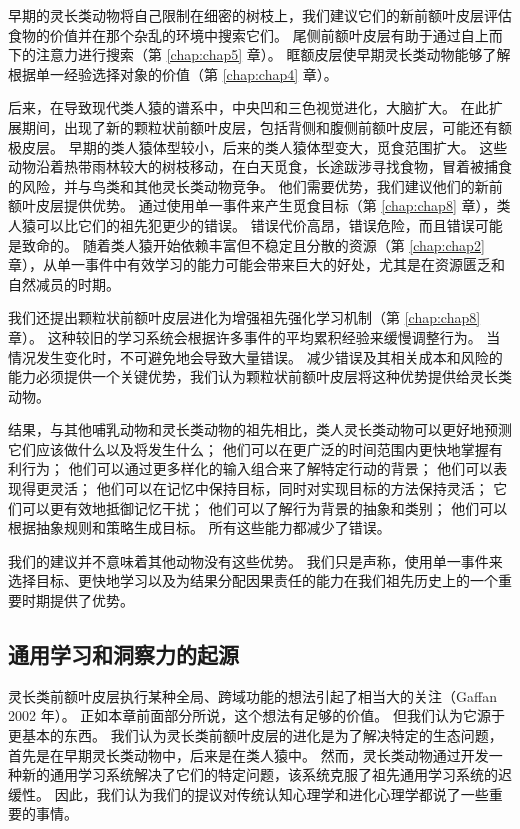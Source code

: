 早期的灵长类动物将自己限制在细密的树枝上，我们建议它们的新前额叶皮层评估食物的价值并在那个杂乱的环境中搜索它们。
尾侧前额叶皮层有助于通过自上而下的注意力进行搜索（第 \ref{chap:chap5} 章）。
眶额皮层使早期灵长类动物能够了解根据单一经验选择对象的价值（第 \ref{chap:chap4} 章）。
\par


后来，在导致现代类人猿的谱系中，中央凹和三色视觉进化，大脑扩大。
在此扩展期间，出现了新的颗粒状前额叶皮层，包括背侧和腹侧前额叶皮层，可能还有额极皮层。
早期的类人猿体型较小，后来的类人猿体型变大，觅食范围扩大。
这些动物沿着热带雨林较大的树枝移动，在白天觅食，长途跋涉寻找食物，冒着被捕食的风险，并与鸟类和其他灵长类动物竞争。
他们需要优势，我们建议他们的新前额叶皮层提供优势。
通过使用单一事件来产生觅食目标（第 \ref{chap:chap8} 章），类人猿可以比它们的祖先犯更少的错误。
错误代价高昂，错误危险，而且错误可能是致命的。
随着类人猿开始依赖丰富但不稳定且分散的资源（第 \ref{chap:chap2} 章），从单一事件中有效学习的能力可能会带来巨大的好处，尤其是在资源匮乏和自然减员的时期。
\par


我们还提出颗粒状前额叶皮层进化为增强祖先强化学习机制（第 \ref{chap:chap8} 章）。
这种较旧的学习系统会根据许多事件的平均累积经验来缓慢调整行为。
当情况发生变化时，不可避免地会导致大量错误。
减少错误及其相关成本和风险的能力必须提供一个关键优势，我们认为颗粒状前额叶皮层将这种优势提供给灵长类动物。
\par


结果，与其他哺乳动物和灵长类动物的祖先相比，类人灵长类动物可以更好地预测它们应该做什么以及将发生什么；
他们可以在更广泛的时间范围内更快地掌握有利行为；
他们可以通过更多样化的输入组合来了解特定行动的背景；
他们可以表现得更灵活；
他们可以在记忆中保持目标，同时对实现目标的方法保持灵活；
它们可以更有效地抵御记忆干扰； 他们可以了解行为背景的抽象和类别；
他们可以根据抽象规则和策略生成目标。
所有这些能力都减少了错误。
\par


我们的建议并不意味着其他动物没有这些优势。
我们只是声称，使用单一事件来选择目标、更快地学习以及为结果分配因果责任的能力在我们祖先历史上的一个重要时期提供了优势。



\subsection{通用学习和洞察力的起源}

灵长类前额叶皮层执行某种全局、跨域功能的想法引起了相当大的关注\cite{dehaene1998neuronal,duncan2010multiple}（Gaffan 2002 年）。
正如本章前面部分所说，这个想法有足够的价值。
但我们认为它源于更基本的东西。
我们认为灵长类前额叶皮层的进化是为了解决特定的生态问题，首先是在早期灵长类动物中，后来是在类人猿中。
然而，灵长类动物通过开发一种新的通用学习系统解决了它们的特定问题，该系统克服了祖先通用学习系统的迟缓性。
因此，我们认为我们的提议对传统认知心理学和进化心理学都说了一些重要的事情。
\par


